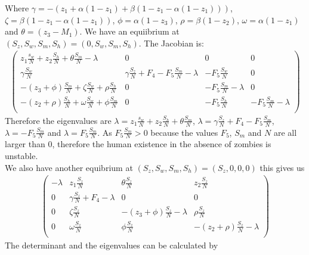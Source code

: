 \documentclass{mm2}
\numberwithin{equation}{section}
\theoremstyle{definition}
\begin{document}
Where $\gamma = -(z_1 + \alpha(1-z_1) + \beta(1-z_1- \alpha(1-z_1)))$, $\zeta = \beta(1-z_1-\alpha(1-z_1))$, $\phi = \alpha(1-z_3)$, $\rho = \beta (1-z_2)$, $\omega = \alpha(1-z_1)$ and $\theta = (z_3- M_1)$. We have an equiibrium at $(S_z, S_w, S_m, S_h) = (0, S_w, S_m, S_h)$. The Jacobian is:
\begin{eqnarray}
\begin{pmatrix}
z_1 \frac{s_w}{N} + z_2 \frac{S_h}{N} + \theta\frac{S_m}{N} - \lambda & 0 & 0 & 0\\
\gamma\frac{S_w}{N} & \gamma\frac{S_z}{N} + F_4 - F_5\frac{S_m}{N} - \lambda & - F_5\frac{S_w}{N} & 0 \\
- (z_3 + \phi) \frac{S_m}{N} + \zeta\frac{S_w}{N} + \rho\frac{S_h}{N} & 0 & - F_5 \frac{S_m}{N} - \lambda & 0\\
- (z_2 + \rho) \frac{ S_h}{N} + \omega\frac{S_w}{N} + \phi \frac{S_m}{N} &  0 & - F_5 \frac{S_h}{N} & - F_5 \frac{S_m}{N} - \lambda\\
\end{pmatrix}
\nonumber
\end{eqnarray}
Therefore the eigenvalues are $\lambda = z_1 \frac{s_w}{N} + z_2 \frac{S_h}{N} + \theta\frac{S_m}{N}$, $\lambda = \gamma\frac{S_z}{N} + F_4 - F_5\frac{S_m}{N}$, $\lambda = - F_5 \frac{S_m}{N}$ and $\lambda =  F_5 \frac{S_m}{N}$. As $F_5 \frac{S_m}{N} >0$ because the values $F_5$, $S_m$ and $N$ are all larger than 0, therefore the human existence in the absence of zombies is unstable.\\
We also have another equibrium at $(S_z, S_w, S_m, S_h) = (S_z, 0, 0, 0)$ this gives us 
\begin{eqnarray}
\begin{pmatrix}
- \lambda & z_1 \frac{S_z}{N} & \theta\frac{S_z}{N} & z_2 \frac{S_z}{N}\\
0 & \gamma\frac{S_z}{N} + F_4 - \lambda & 0 & 0 \\
0 & \zeta\frac{S_z}{N} & - (z_3+ \phi)\frac{S_z}{N} - \lambda & \rho \frac{S_z}{N}\\
0 &  \omega\frac{S_z}{N} & \phi \frac{S_z}{N} & - (z_2 + \rho)\frac{S_z}{N} - \lambda\\
\end{pmatrix}
\nonumber
\end{eqnarray}
The determinant and the eigenvalues can be calculated by 
\end{document}
